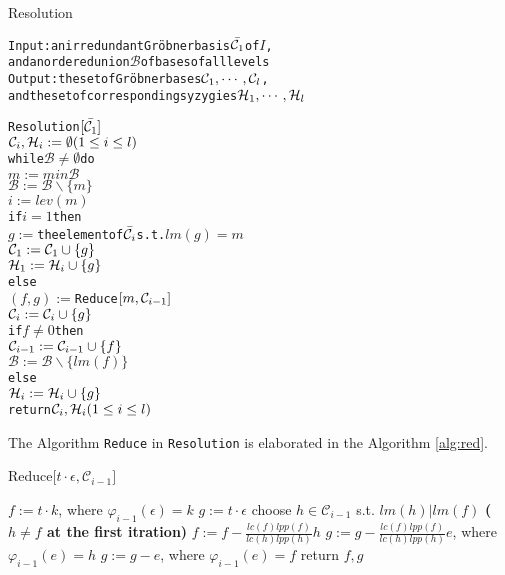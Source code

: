 \documentclass{article}
\theoremstyle{definition}
\theoremstyle{remark}
\theoremstyle{example}
\begin{document}
\begin{algorithm}[H]
\caption{Resolution}\label{alg:res}
    \begin{alltt}
        Input: an irredundant Gröbner basis \(\bar{{\mathcal{C}}\sb{1}}\) of \(I\), 
        and an ordered union \(\mathcal{B}\) of bases of all levels
        Output: the set of Gröbner bases \(\mathcal{C}\sb{1},\cdots,\mathcal{C}\sb{l}\),
        and the set of corresponding syzygies \(\mathcal{H}\sb{1},\cdots,\mathcal{H}\sb{l}\)
        
        Resolution\([\bar{{\mathcal{C}}\sb{1}}]\)
        \({\mathcal{C}}\sb{i},{\mathcal{H}}\sb{i}:=\emptyset (1\leq i\leq l)\)
        while \(\mathcal{B}\neq\emptyset\) do
        \quad \quad \(m:=min\mathcal{B}\)
        \quad \quad \(\mathcal{B}:=\mathcal{B}\backslash\{m\}\)
        \quad \quad \(i:=lev(m)\)
        \quad \quad if \(i=1\) then
        \quad \quad \quad \quad \(g:=\) the element of \(\bar{{\mathcal{C}}\sb{i}}\) s.t. \(lm(g)=m\)
        \quad \quad \quad \quad \({\mathcal{C}}\sb{1}:={\mathcal{C}}\sb{1}\cup\{g\}\)
        \quad \quad \quad \quad \({\mathcal{H}}\sb{1}:={\mathcal{H}}\sb{i}\cup\{g\}\)
        \quad \quad else
        \quad \quad \quad \quad \((f,g):=\)Reduce\([m,{\mathcal{C}}\sb{i-1}]\)
        \quad \quad \quad \quad \({\mathcal{C}}\sb{i}:={\mathcal{C}}\sb{i}\cup\{g\}\)
        \quad \quad \quad \quad if \(f\neq 0\) then
        \quad \quad \quad \quad \quad \quad \({\mathcal{C}}\sb{i-1}:={\mathcal{C}}\sb{i-1}\cup\{f\}\)
        \quad \quad \quad \quad \quad \quad \(\mathcal{B}:=\mathcal{B}\backslash\{lm(f)\}\)
        \quad \quad \quad \quad else
        \quad \quad \quad \quad \quad \quad\({\mathcal{H}}\sb{i}:={\mathcal{H}}\sb{i}\cup\{g\}\)
        return \({\mathcal{C}}\sb{i},{\mathcal{H}}\sb{i}(1\leq i\leq l)\)
\end{alltt}
\end{algorithm}

The Algorithm \verb+Reduce+ in \verb+Resolution+ is elaborated in the Algorithm \ref{alg:red}.

\begin{algorithm}
\caption{Reduce[$t\cdot \epsilon,\mathcal{C}_{i-1}]$}\label{alg:red}
    \begin{algorithmic}
    \State $f:=t\cdot k$, where $\varphi_{i-1}(\epsilon) = k$
    \State $g:=t\cdot \epsilon$
        \State choose  $h \in \mathcal{C}_{i-1}$ s.t. $lm(h)\vert lm(f)$  \textbf{($h \neq f$ at the first itration)}
        \State $f := f - \tfrac{lc(f)lpp(f)}{lc(h)lpp(h)}h$
        \State $g := g - \tfrac{lc(f)lpp(f)}{lc(h)lpp(h)}e$, where $\varphi_{i-1}(e) = h$
    \EndWhile
        \State $g := g - e$, where $\varphi_{i-1}(e) = f$
    \EndIf
    \State return $f,g$
    \end{algorithmic}
\end{algorithm}
\end{document}
